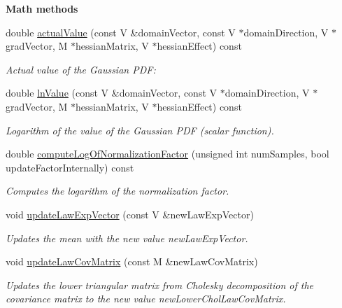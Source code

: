 \begin{Indent}{\bf Math methods}\par
\begin{DoxyCompactItemize}
\item 
double \hyperlink{class_q_u_e_s_o_1_1_gaussian_joint_pdf_ae576dae6a972dd7350ca261569f056da}{actual\-Value} (const V \&domain\-Vector, const V $\ast$domain\-Direction, V $\ast$grad\-Vector, M $\ast$hessian\-Matrix, V $\ast$hessian\-Effect) const 
\begin{DoxyCompactList}\small\item\em Actual value of the Gaussian P\-D\-F\-: \end{DoxyCompactList}\item 
double \hyperlink{class_q_u_e_s_o_1_1_gaussian_joint_pdf_a14207045679234c5112974be5445b30d}{ln\-Value} (const V \&domain\-Vector, const V $\ast$domain\-Direction, V $\ast$grad\-Vector, M $\ast$hessian\-Matrix, V $\ast$hessian\-Effect) const 
\begin{DoxyCompactList}\small\item\em Logarithm of the value of the Gaussian P\-D\-F (scalar function). \end{DoxyCompactList}\item 
double \hyperlink{class_q_u_e_s_o_1_1_gaussian_joint_pdf_af5cfad4df319c6f535c0a9b739d0c398}{compute\-Log\-Of\-Normalization\-Factor} (unsigned int num\-Samples, bool update\-Factor\-Internally) const 
\begin{DoxyCompactList}\small\item\em Computes the logarithm of the normalization factor. \end{DoxyCompactList}\item 
void \hyperlink{class_q_u_e_s_o_1_1_gaussian_joint_pdf_ab523fc855a49dfd3dbeab93d01506ffc}{update\-Law\-Exp\-Vector} (const V \&new\-Law\-Exp\-Vector)
\begin{DoxyCompactList}\small\item\em Updates the mean with the new value {\ttfamily new\-Law\-Exp\-Vector}. \end{DoxyCompactList}\item 
void \hyperlink{class_q_u_e_s_o_1_1_gaussian_joint_pdf_a49d6451f8a54c12715f7ef22fdbc3314}{update\-Law\-Cov\-Matrix} (const M \&new\-Law\-Cov\-Matrix)
\begin{DoxyCompactList}\small\item\em Updates the lower triangular matrix from Cholesky decomposition of the covariance matrix to the new value {\ttfamily new\-Lower\-Chol\-Law\-Cov\-Matrix}. \end{DoxyCompactList}\item 

\end{DoxyCompactItemize}
\end{Indent}
